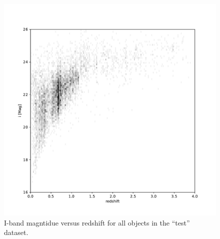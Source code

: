 \begin{figure}
    \centering
    \includegraphics[width=\linewidth]{figures/mag_i_v_redshift.pdf}
    \caption{I-band magntidue versus redshift for all objects in the ``test'' dataset.}
    \label{fig:dp_mag_i_v_redshift}
\end{figure}

